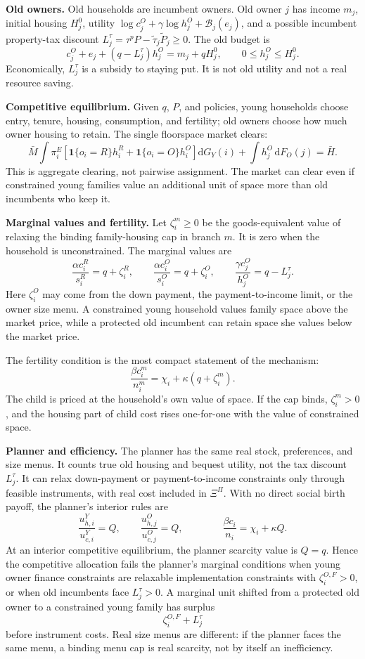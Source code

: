 \documentclass[10pt]{article}
\newcommand{\dd}{\mathrm d}
\newcommand{\1}{\mathbf 1}
\begin{document}
\textbf{Old owners.}
Old households are incumbent owners. Old owner \(j\) has income \(m_j\), initial housing \(H_j^0\), utility \(\log c_j^O+\gamma\log h_j^O+\mathcal B_j(e_j)\), and a possible incumbent property-tax discount \(L_j^\tau=\tau^pP-\tilde\tau_j\tilde P_j\ge0\). The old budget is
\[
c_j^O+e_j+(q-L_j^\tau)h_j^O=m_j+q H_j^0,\qquad 0\le h_j^O\le H_j^0 .
\]
Economically, \(L_j^\tau\) is a subsidy to staying put. It is not old utility and not a real resource saving.

\textbf{Competitive equilibrium.}
Given \(q\), \(P\), and policies, young households choose entry, tenure, housing, consumption, and fertility; old owners choose how much owner housing to retain. The single floorspace market clears:
\[
\bar M\int \pi_i^E
\left[\1\{o_i=R\}h_i^R+\1\{o_i=O\}h_i^O\right]\dd G_Y(i)
+\int h_j^O\,\dd F_O(j)=\bar H .
\]
This is aggregate clearing, not pairwise assignment. The market can clear even if constrained young families value an additional unit of space more than old incumbents who keep it.

\textbf{Marginal values and fertility.}
Let \(\zeta_i^m\ge0\) be the goods-equivalent value of relaxing the binding family-housing cap in branch \(m\). It is zero when the household is unconstrained. The marginal values are
\[
\frac{\alpha c_i^R}{s_i^R}=q+\zeta_i^R,\qquad
\frac{\alpha c_i^O}{s_i^O}=q+\zeta_i^O,\qquad
\frac{\gamma c_j^O}{h_j^O}=q-L_j^\tau .
\]
Here \(\zeta_i^O\) may come from the down payment, the payment-to-income limit, or the owner size menu. A constrained young household values family space above the market price, while a protected old incumbent can retain space she values below the market price.

The fertility condition is the most compact statement of the mechanism:
\[
\frac{\beta c_i^m}{n_i^m}
=
\chi_i+\kappa(q+\zeta_i^m).
\]
The child is priced at the household's own value of space. If the cap binds, \(\zeta_i^m>0\), and the housing part of child cost rises one-for-one with the value of constrained space.

\textbf{Planner and efficiency.}
The planner has the same real stock, preferences, and size menus. It counts true old housing and bequest utility, not the tax discount \(L_j^\tau\). It can relax down-payment or payment-to-income constraints only through feasible instruments, with real cost included in \(\Xi^\Pi\). With no direct social birth payoff, the planner's interior rules are
\[
\frac{u_{h,i}^Y}{u_{c,i}^Y}=Q,\qquad
\frac{u_{h,j}^O}{u_{c,j}^O}=Q,\qquad
\qquad
\frac{\beta c_i}{n_i}=\chi_i+\kappa Q .
\]
At an interior competitive equilibrium, the planner scarcity value is \(Q=q\). Hence the competitive allocation fails the planner's marginal conditions when young owner finance constraints are relaxable implementation constraints with \(\zeta_i^{O,F}>0\), or when old incumbents face \(L_j^\tau>0\). A marginal unit shifted from a protected old owner to a constrained young family has surplus
\[
\zeta_i^{O,F}+L_j^\tau
\]
before instrument costs. Real size menus are different: if the planner faces the same menu, a binding menu cap is real scarcity, not by itself an inefficiency.
\end{document}
